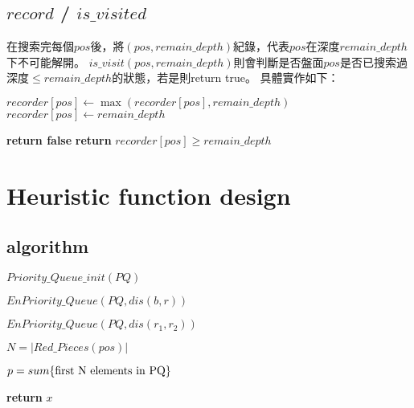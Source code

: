 \documentclass[a4paper, 12pt]{article}  %
\begin{document}
\subsection{$record$ / $is\_visited$}
在搜索完每個$pos$後，將$(pos, remain\_depth)$紀錄，代表$pos$在深度$remain\_depth$下不可能解開。
$is\_visit(pos, remain\_depth)$則會判斷是否盤面$pos$是否已搜索過深度$\le remain\_depth$的狀態，若是則return true。
具體實作如下：

\begin{algorithm}
    \begin{algorithmic}
                \State$recorder[pos] \gets \max(recorder[pos], remain\_depth)$
            \Else
                \State $recorder[pos] \gets remain\_depth$
            \EndIf
        \EndProcedure

                \textbf{return false}
            \Else
                \textbf{ return} $recorder[pos] \ge remain\_depth$
            \EndIf
        \EndProcedure
    \end{algorithmic}
\end{algorithm}



\newpage
\section{Heuristic function design}

\subsection{algorithm}

\begin{algorithmic}[] %
    \State$Priority\_Queue\_init(PQ)$

                \State$EnPriority\_Queue(PQ, dis(b,r))$
            \EndIf
        \EndFor
    \EndFor


            \State$EnPriority\_Queue(PQ, dis(r_1,r_2))$
        \EndFor
    \EndFor

    \State$N = |Red\_Pieces(pos)|$

    \State$p = sum\{{\rm first\ N\ elements\ in\ PQ}\}$

    \State\textbf{return} $x$
    \EndProcedure
\end{algorithmic}
\end{document}
